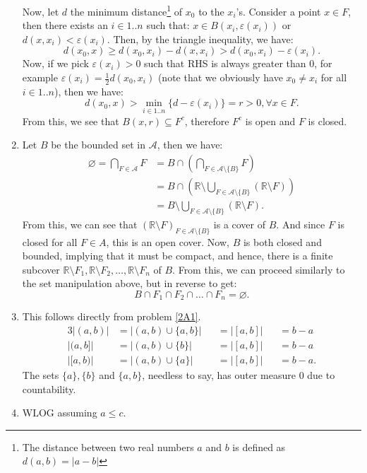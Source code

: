 \begin{enumerate}[label=\textbf{2A.\arabic*}]
    Now, let \( d \) the minimum distance\footnote{The distance between two
    real numbers \( a \) and \( b \) is defined as \( d(a, b) = |a - b| \)} of
    \( x_{0} \) to the \( x_{i} \)'s.
    Consider a point \( x \in F \), then there exists an \( i \in 1..n \) such
    that: \( x \in B(x_{i}, \varepsilon(x_{i})) \) or \( d(x, x_{i}) <
    \varepsilon(x_{i}) \). Then, by the triangle inequality, we have:
    \[
      d(x_{0}, x) \ge d(x_{0}, x_{i}) - d(x, x_{i}) > d(x_{0}, x_{i}) -
      \varepsilon(x_{i})
    .\] 
    Now, if we pick \( \varepsilon(x_{i}) > 0 \) such that RHS is always greater
    than \( 0 \), for example \( \varepsilon(x_{i}) = \frac{1}{2}d(x_{0}, x_{i})
    \) (note that we obviously have \( x_{0} \neq  x_{i} \) for all \( i \in
    1..n \)), then we have:
    \[
      d(x_{0}, x) > \min_{i \in 1..n} \{d - \varepsilon(x_{i})\} = r > 0, \forall x \in
      F
    .\]
    From this, we see that \( B(x, r) \subseteq F^{c} \), therefore \( F^{c} \)
    is open and \( F \) is closed.
  \item \label{2A5} Let \( B \) be the bounded set in \( \mathcal{A} \), then we have:
    \begin{align*}
      \varnothing =  \bigcap_{F \in \mathcal{A}} F &= B \cap \left(
      \bigcap_{F \in \mathcal{A} \setminus \{B\}  } F \right)  \\
      &= B \cap \left( \mathbb{R} \setminus \bigcup_{F \in \mathcal{A} \setminus \{B\}
      } (\mathbb{R}\setminus F) \right)  \\
      &= B \setminus \bigcup_{F \in \mathcal{A} \setminus \{B\}  } (\mathbb{R} \setminus
      F)
    .\end{align*}
    From this, we can see that \( (\mathbb{R} \setminus F)_{F \in \mathcal{A}\setminus
    \{B\}  } \) is a cover of \( B \). And since \( F \) is closed for all \( F
    \in A\), this is an open cover. Now, \( B \) is both closed and bounded,
    implying that it must be compact, and hence, there is a finite subcover \(
    \mathbb{R}\setminus F_{1}, \mathbb{R}\setminus F_{2}, \ldots , \mathbb{R}
    \setminus F_{n} \) of \( B \). From this, we can proceed similarly to the
    set manipulation above, but in reverse to get:
    \[
      B \cap  F_{1} \cap  F_{2} \cap  \ldots \cap  F_{n} = \varnothing
    .\] 
  \item This follows directly from problem \ref{2A1}.
    \begin{alignat*}{3}
      |(a, b)| &= |(a, b) \cup \{a, b\}  | &&= |[a, b]| &&= b - a\\
      |(a, b]| &= |(a, b) \cup \{b\}  | &&= |[a, b]| &&= b - a\\
      |[a, b)| &= |(a, b) \cup \{a\}  | &&= |[a, b]| &&= b - a
    .\end{alignat*}
    The sets \( \{a\} , \{b\}    \) and \( \{a, b\}   \), needless to say, has
    outer measure \( 0 \) due to countability.
  \item \label{2A7} WLOG assuming \( a \le c \).


\end{enumerate}
